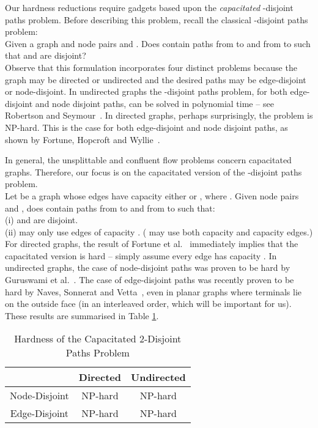 \documentclass[12pt]{article}
\begin{document}
Our hardness reductions require gadgets based upon the {\em capacitated} -disjoint paths problem.
Before describing this problem, recall the classical -disjoint paths problem:\\

 Given a graph  and node pairs 
and . Does  contain paths  from  to 
and  from  to  such that  and  are disjoint?\\

Observe that this formulation incorporates four distinct problems
because the graph  may be directed or undirected and the desired paths
may be edge-disjoint or node-disjoint.
In undirected graphs the -disjoint paths problem, for both edge-disjoint and node disjoint paths,
can be solved in polynomial time
-- see  Robertson and Seymour~\cite{RS95}.
In directed graphs, perhaps surprisingly, the problem is NP-hard. This is the
case for both edge-disjoint and node disjoint paths, as shown
by  Fortune, Hopcroft and Wyllie~\cite{FHW80}.

In general, the unsplittable and confluent flow problems concern capacitated graphs.
Therefore, our focus is on the capacitated version of the -disjoint paths problem. \\


 Let  be a graph whose edges have
capacity either  or , where .
Given node pairs 
and , does  contain paths  from  to 
and  from  to  such that:\\
(i)  and  are disjoint.\\
(ii)  may only use edges of capacity . (
may use both capacity  and capacity  edges.) \\


For directed graphs, the result of Fortune et al.~\cite{FHW80} immediately implies that the capacitated version is
hard -- simply assume every edge has capacity . In undirected graphs, the case of node-disjoint paths
was proven to be hard by Guruswami et al.~\cite{guruswami2003near}. The case of edge-disjoint paths was recently
proven to be hard by Naves, Sonnerat and Vetta~\cite{naves2010maximum}, even in
planar graphs where terminals lie on the outside face (in an interleaved order, which will be important for us). These results are summarised in Table \ref{table:hardness}.
\begin{table}[h]
      \centering
          \begin{tabular}{|c|cc|}
          \hline
& Directed & Undirected \\
\hline
Node-Disjoint  &    NP-hard \cite{FHW80} & NP-hard \cite{guruswami2003near} \\
Edge-Disjoint  & NP-hard \cite{FHW80} & NP-hard  \cite{naves2010maximum} \\
\hline
   \end{tabular}
\caption{Hardness of the Capacitated 2-Disjoint Paths Problem}\label{table:hardness}
\end{table}
\end{document}
